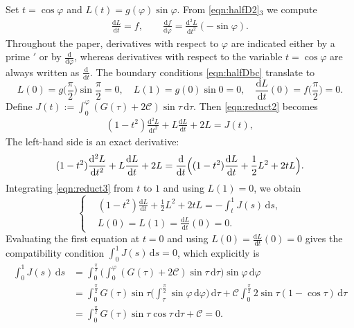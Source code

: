 \documentclass{amsart}
\newcommand{\mcC}{\mathcal{C}}
\newcommand{\rmd}{\mathrm{d}}
\begin{document}
Set $t = \cos\varphi$ and $L(t) = g(\varphi)\sin\varphi$. From \eqref{eqn:halfD2}$_3$ we compute
\begin{align*}
\frac{\mathrm{d} L}{\mathrm{d} t} = f,\qquad
\frac{\mathrm{d} f}{\mathrm{d} \varphi} = \frac{\mathrm{d}^2 L}{\mathrm{d} t^2}(-\sin\varphi).
\end{align*}
Throughout the paper, derivatives with respect to $\varphi$ are indicated either by a prime $'$ or by $\frac{\mathrm{d}}{\mathrm{d}\varphi}$, whereas derivatives with respect to the variable $t = \cos\varphi$ are always written as $\frac{\mathrm{d}}{\mathrm{d}t}$.
The boundary conditions \eqref{eqn:halfDbc} translate to
\[
L(0)=g\bigl(\frac{\pi}{2}\bigr)\sin\frac{\pi}{2}=0,\quad
L(1)=g(0)\sin0=0,\quad
\frac{\mathrm{d} L}{\mathrm{d} t}(0)=f\bigl(\frac{\pi}{2}\bigr)=0.
\]
Define $J(t):=\int_0^{\varphi} (G(\tau) + 2\mcC) \sin\tau \, \mathrm{d}\tau$.  Then \eqref{eqn:reduct2} becomes
\begin{align}\label{eqn:reduct3}
    (1-t^2)\frac{\mathrm{d}^2 L}{\mathrm{d} t^2} + L\frac{\mathrm{d} L}{\mathrm{d} t} + 2L = J(t),
\end{align}
The left-hand side is an exact derivative:
\[
(1-t^2)\frac{\mathrm{d}^2 L}{\mathrm{d} t^2} + L\frac{\mathrm{d} L}{\mathrm{d} t} + 2L
= \frac{\mathrm{d}}{\mathrm{d} t}\Bigl( (1-t^2)\frac{\mathrm{d} L}{\mathrm{d} t}+\frac{1}{2}L^2 +2 t L \Bigr).
\]
Integrating \eqref{eqn:reduct3} from $t$ to $1$ and using $L(1)=0$, we obtain
\begin{equation}\label{eqn:reduct4}
\left\{
\begin{aligned}
&(1-t^2)\frac{\mathrm{d} L}{\mathrm{d} t}+\frac{1}{2}L^2 +2 t L= -\int_{t}^1 J(s) \, \mathrm{d} s,\\
&L(0)=L(1)=\frac{\rmd L}{\rmd t}(0)=0.
\end{aligned}
\right.
\end{equation}
Evaluating the first equation at $t=0$ and using $L(0)=\frac{\mathrm{d} L}{\mathrm{d} t}(0)=0$ gives the compatibility condition
$\int_0^1 J(s)\,\mathrm{d}s = 0$, which explicitly is
\begin{equation}\label{eqn:constC}
\begin{aligned}
\int_0^1 J(s) \, \mathrm{d} s 
&= \int_0^{\frac{\pi}{2}} \biggl(\int_0^{\varphi} (G(\tau) +2 \mcC) \sin\tau \, \mathrm{d}\tau \biggr) \sin\varphi \, \mathrm{d}\varphi\\
&= \int_0^{\frac{\pi}{2}} G(\tau) \sin\tau \biggl(\int_{\tau}^{\frac{\pi}{2}}
\sin\varphi \, \mathrm{d}\varphi \biggr) \, \mathrm{d}\tau + \mcC \int_0^{\frac{\pi}{2}} 2\sin\tau(1-\cos\tau)\,\mathrm{d}\tau\\
&= \int_0^{\frac{\pi}{2}} G(\tau) \sin\tau \cos\tau \, \mathrm{d}\tau + \mcC = 0.
\end{aligned}
\end{equation}
\end{document}
